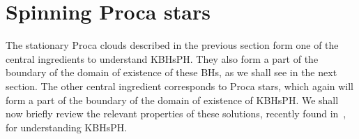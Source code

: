 \section{Spinning Proca stars} 
\label{sec_stars}
The stationary Proca clouds described in the previous section form one of the central ingredients to understand KBHsPH.
They also form a part of the boundary of the domain of existence of these BHs, as we shall see in the next section. The other central ingredient corresponds to Proca stars, which again will form a part of the boundary of the domain of existence of KBHsPH. We shall now briefly review the relevant properties of these solutions, recently found in~\cite{Brito:2015pxa}, for understanding KBHsPH.

